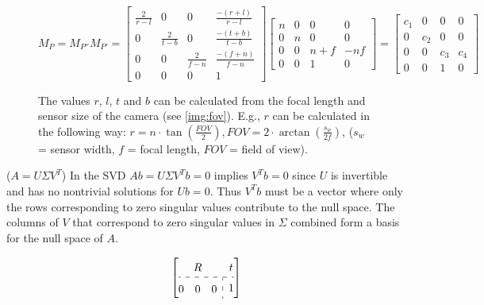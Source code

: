 \documentclass[conference]{IEEEtran}
\begin{document}
\begin{figure}[h]
    \begin{equation} \label{eqn:API_matrix}
        M_{P} = M_{P''} M_{P'} =
        \begin{bmatrix}
            \frac{2}{r - l} & 0               & 0               & \frac{-(r + l)}{r - l} \\
            0               & \frac{2}{t - b} & 0               & \frac{-(t + b)}{t - b} \\
            0               & 0               & \frac{2}{f - n} & \frac{-(f + n)}{f - n} \\
            0               & 0               & 0               & 1
        \end{bmatrix}
        \begin{bmatrix}
            n & 0 & 0     & 0   \\
            0 & n & 0     & 0   \\
            0 & 0 & n + f & -nf \\
            0 & 0 & 1     & 0
        \end{bmatrix}
        =
        \begin{bmatrix}
            c_1 & 0   & 0   & 0   \\
            0   & c_2 & 0   & 0   \\
            0   & 0   & c_3 & c_4 \\
            0   & 0   & 1   & 0
        \end{bmatrix}
    \end{equation}
    \caption[]{The values $r$, $l$, $t$ and $b$ can be calculated from the focal length and sensor size of the camera (see \ref{img:fov}). E.g., $r$ can be calculated in the following way:
        $r = n \cdot \tan\left(\frac{FOV}{2}\right),
        FOV = 2 \cdot \arctan\left(\frac{s_w}{2f}\right)$,
        ($s_w$ = sensor width, $f$ = focal length, $FOV$ = field of view).
    }
\end{figure}

($A = U\Sigma V^{T}$)
\cite{SVD}
In the SVD $Ab = U\Sigma V^{T}b = 0$ implies $V^{T}b = 0$ since $U$ is invertible and has no nontrivial solutions for $Ub = 0$.
Thus $V^{T}b$ must be a vector where only the rows corresponding to zero singular values contribute to the null space.
The columns of $V$ that correspond to zero singular values in $\Sigma$ combined form a basis for the null space of $A$.

\[
    \renewcommand{\arraystretch}{1.5}
    \left[\begin{array}{@{}c:c@{}}
            R                        & t \\ \hdashline
            \begin{array}{@{}ccc@{}}
                0 & 0 & 0
            \end{array} & 1
        \end{array}\right]
\]
\end{document}
